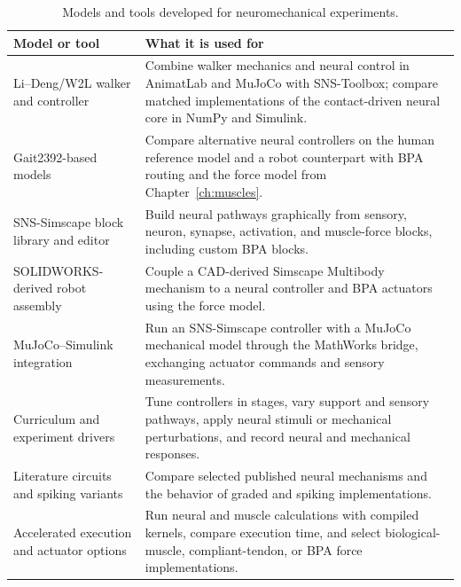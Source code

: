 \begin{table}[htbp]
\centering
\caption[Models and tools developed for neuromechanical experiments]{Models and tools developed for neuromechanical experiments.}
\label{tab:sns_capability}
\small
\begin{tabularx}{\textwidth}{@{}>{\raggedright\arraybackslash}p{}>{\raggedright\arraybackslash}X@{}}
\toprule
\textbf{Model or tool} & \textbf{What it is used for} \\
\midrule
Li--Deng/W2L walker and controller & Combine walker mechanics and neural control in AnimatLab and MuJoCo with SNS-Toolbox; compare matched implementations of the contact-driven neural core in NumPy and Simulink. \\
Gait2392-based models & Compare alternative neural controllers on the human reference model and a robot counterpart with BPA routing and the force model from Chapter~\ref{ch:muscles}. \\
SNS-Simscape block library and editor & Build neural pathways graphically from sensory, neuron, synapse, activation, and muscle-force blocks, including custom BPA blocks. \\
SOLIDWORKS-derived robot assembly & Couple a CAD-derived Simscape Multibody mechanism to a neural controller and BPA actuators using the force model. \\
MuJoCo--Simulink integration & Run an SNS-Simscape controller with a MuJoCo mechanical model through the MathWorks bridge, exchanging actuator commands and sensory measurements. \\
Curriculum and experiment drivers & Tune controllers in stages, vary support and sensory pathways, apply neural stimuli or mechanical perturbations, and record neural and mechanical responses. \\
Literature circuits and spiking variants & Compare selected published neural mechanisms and the behavior of graded and spiking implementations. \\
Accelerated execution and actuator options & Run neural and muscle calculations with compiled kernels, compare execution time, and select biological-muscle, compliant-tendon, or BPA force implementations. \\
\bottomrule
\end{tabularx}
\end{table}

